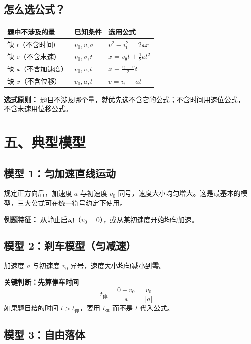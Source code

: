 \subsection*{怎么选公式？}

\begin{center}
\begin{tabular}{lll}
\toprule
题中不涉及的量 & 已知条件 & 选用公式 \\
\midrule
缺 $t$（不含时间） & $v_0, v, a$ & $v^2 - v_0^2 = 2ax$ \\
缺 $v$（不含末速） & $v_0, a, t$ & $x = v_0 t + \frac12 a t^2$ \\
缺 $a$（不含加速度） & $v_0, v, t$ & $x = \frac{v_0+v}{2} t$ \\
缺 $x$（不含位移） & $v_0, a, t$ & $v = v_0 + at$ \\
\bottomrule
\end{tabular}
\end{center}

\textbf{选式原则：} 题目不涉及哪个量，就优先选不含它的公式；不含时间用速位公式，不含末速用位移公式。

\section*{五、典型模型}

\subsection*{模型 1：匀加速直线运动}

规定正方向后，加速度 $a$ 与初速度 $v_0$ 同号，速度大小均匀增大。这是最基本的模型，三大公式可在统一符号约定下使用。

\textbf{例题特征：} 从静止启动（$v_0=0$），或从某初速度开始均匀加速。

\subsection*{模型 2：刹车模型（匀减速）}

加速度 $a$ 与初速度 $v_0$ 异号，速度大小均匀减小到零。

\textbf{关键判断：先算停车时间}
\[
t_{\text{停}} = \frac{0 - v_0}{a} = \frac{v_0}{|a|}
\]
如果题目给的时间 $t > t_{\text{停}}$，要用 $t_{\text{停}}$ 而不是 $t$ 代入公式。

\subsection*{模型 3：自由落体}

